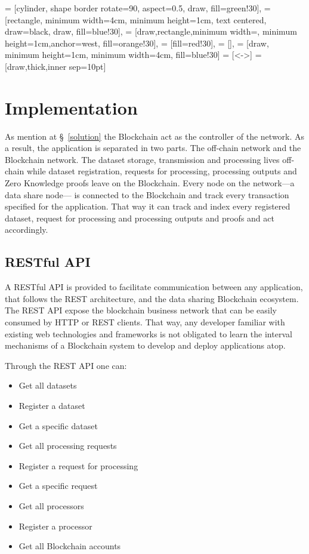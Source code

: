 
 = [cylinder, shape border rotate=90, aspect=0.5, draw, fill=green!30],
 = [rectangle, minimum width=4cm, minimum height=1cm, text centered, draw=black, draw, fill=blue!30],
 = [draw,rectangle,minimum width=\textwidth, minimum height=1cm,anchor=west, fill=orange!30],
 = [fill=red!30],
 = [],
 = [draw, minimum height=1cm, minimum width=4cm, fill=blue!30]
 = [<->]
 = [draw,thick,inner sep=10pt]

\chapter{Implementation}
\label{implemenation}

As mention at §~\ref{solution} the Blockchain act as the controller of the network. As a result, the application is separated in two parts. The off-chain network and the Blockchain network. The dataset storage, transmission and processing lives off-chain while dataset registration, requests for processing, processing outputs and Zero Knowledge proofs leave on the Blockchain. Every node on the network---a data share node--- is connected to the Blockchain and track every transaction specified for the application. That way it can track and index every registered dataset, request for processing and processing outputs and proofs and act accordingly.

\section{RESTful API}
\label{implemenation:rest}

A RESTful API is provided to facilitate communication between any application, that follows the REST architecture, and the data sharing Blockchain ecosystem. The REST API expose the blockchain business network that can be easily consumed by HTTP or REST clients. That way, any developer familiar with existing web technologies and frameworks is not obligated to learn the interval mechanisms of a Blockchain system to develop and deploy applications atop.

Through the REST API one can:

\begin{itemize}
  \item Get all datasets
  \item Register a dataset
  \item Get a specific dataset
  \item Get all processing requests
  \item Register a request for processing
  \item Get a specific request
  \item Get all processors
  \item Register a processor
  \item Get all Blockchain accounts
\end{itemize}

